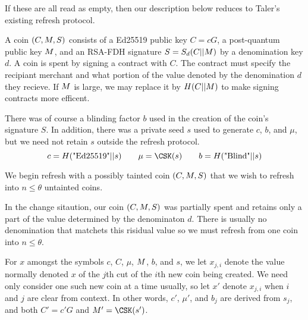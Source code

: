 \documentclass{llncs}
\begin{document}
If these are all read as empty, then our description below reduces
to Taler's existing refresh protocol. 

\smallskip

A coin $(C,M,S)$ consists of 
  a Ed25519 public key $C = c G$,
  a post-quantum public key $M$, and
  an RSA-FDH signature $S = S_d(C || M)$ by a denomination key $d$.
A coin is spent by signing a contract with $C$.  The contract must
specify the recipiant merchant and what portion of the value denoted
by the denomination $d$ they recieve.
If $M$ is large, we may replace it by $H(C || M)$ to make signing
contracts more efficent.

There was of course a blinding factor $b$ used in the creation of
the coin's signature $S$.  In addition, there was a private seed $s$
used to generate $c$, $b$, and $\mu$, but we need not retain $s$
outside the refresh protocol.
$$ c = H(\textrm{"Ed25519"} || s)
\qquad \mu = \CSK(s)
\qquad b = H(\textrm{"Blind"} || s) $$

\smallskip

We begin refresh with a possibly tainted coin $(C,M,S)$ that
we wish to refresh into $n \le \theta$ untainted coins.  

In the change sitaution, our coin $(C,M,S)$ was partially spent and 
retains only a part of the value determined by the denominaton $d$.
There is usually no denomination that matchets this risidual value
so we must refresh from one coin into $n \le \theta$.

For $x$ amongst the symbols $c$, $C$, $\mu$, $M$, $b$, and $s$,
we let $x_{j,i}$ denote the value normally denoted $x$ of
 the $j$th cut of the $i$th new coin being created. 
We need only consider one such new coin at a time usually, 
so let $x'$ denote $x_{j,i}$ when $i$ and $j$ are clear from context.
In other words, $c'$, $\mu'$, and $b_j$ are derived from $s_j$,
 and both $C' = c' G$ and $\Mu' = \CSK(s')$.
\end{document}

